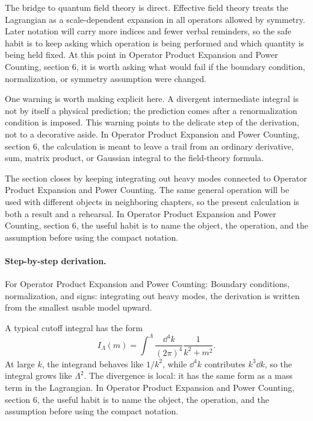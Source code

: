 The bridge to quantum field theory is direct.  Effective field theory treats the Lagrangian as a scale-dependent expansion in all operators allowed by symmetry.  Later notation will carry more indices and fewer verbal reminders, so the safe habit is to keep asking which operation is being performed and which quantity is being held fixed.  At this point in Operator Product Expansion and Power Counting, section 6, it is worth asking what would fail if the boundary condition, normalization, or symmetry assumption were changed.

One warning is worth making explicit here.  A divergent intermediate integral is not by itself a physical prediction; the prediction comes after a renormalization condition is imposed.  This warning points to the delicate step of the derivation, not to a decorative aside.  In Operator Product Expansion and Power Counting, section 6, the calculation is meant to leave a trail from an ordinary derivative, sum, matrix product, or Gaussian integral to the field-theory formula.

The section closes by keeping integrating out heavy modes connected to Operator Product Expansion and Power Counting.  The same general operation will be used with different objects in neighboring chapters, so the present calculation is both a result and a rehearsal.  In Operator Product Expansion and Power Counting, section 6, the useful habit is to name the object, the operation, and the assumption before using the compact notation.



\paragraph{Step-by-step derivation.}

For Operator Product Expansion and Power Counting: Boundary conditions, normalization, and signs: integrating out heavy modes, the derivation is written from the smallest usable model upward.

A typical cutoff integral has the form
\[
  I_\Lambda(m)=\int^{\Lambda}\frac{\dd^4k}{(2\pi)^4}\frac{1}{k^2+m^2}.
\]
At large \(k\), the integrand behaves like \(1/k^2\), while \(\dd^4k\) contributes \(k^3\dd k\), so the integral grows like \(\Lambda^2\).  The divergence is local: it has the same form as a mass term in the Lagrangian.  In Operator Product Expansion and Power Counting, section 6, the useful habit is to name the object, the operation, and the assumption before using the compact notation.

